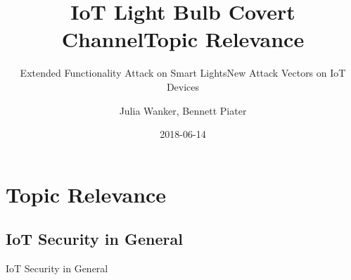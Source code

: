 \documentclass[11pt,t,usepdftitle=false,aspectratio=169]{beamer}
\title[IoT Light Bulb Attack]{IoT Light Bulb Covert Channel}
\subtitle{Extended Functionality Attack on Smart Lights}
\author[Julia Wanker \& Bennett Piater]{Julia Wanker, Bennett Piater}
\date{2018-06-14}
\begin{document}



\section{Topic Relevance} %
\label{sec:relevance}
\title{Topic Relevance}
\subtitle{New Attack Vectors on IoT Devices}

\subsection{IoT Security in General} %
\label{sub:general_security}
\begin{frame}{IoT Security in General}

\end{frame}
\end{document}
